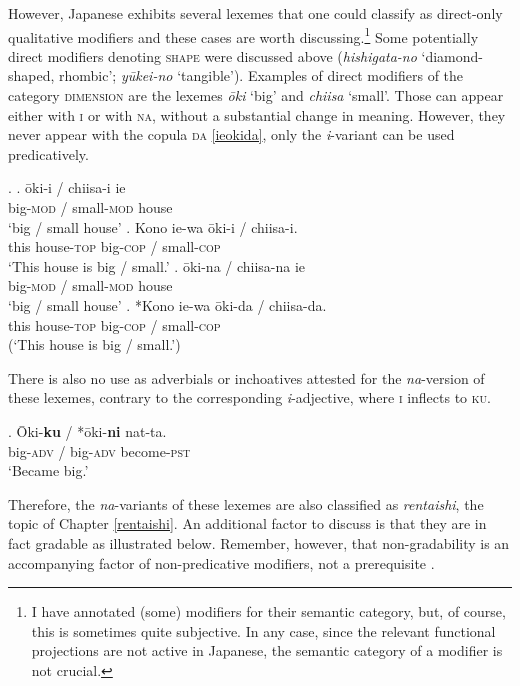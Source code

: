 \documentclass [output=book,colorlinks,citecolor=brown]{langscibook}
\begin{document}
However, Japanese exhibits several lexemes that one could classify as direct-only qualitative modifiers and these cases are worth discussing.\footnote{I have annotated (some) modifiers for their semantic category, but, of course, this is sometimes quite subjective. In any case, since the relevant functional projections are not active in Japanese, the semantic category of a modifier is not crucial.} Some potentially direct modifiers denoting \textsc{shape} were discussed above (\textit{hishigata-no} `diamond-shaped, rhombic’; \textit{yūkei-no} `tangible’). Examples of direct modifiers of the category \textsc{dimension} are the lexemes \textit{ōki} `big' and \textit{chiisa} `small’. Those can appear either with \textsc{i} or with \textsc{na}, without a substantial change in meaning. However, they never appear with the copula \textsc{da} \ref{ieokida}, only the \textit{i}-variant can be used predicatively. %

\newpage

\ex. \ag. ōki-i / chiisa-i ie\\
big-\textsc{mod} / small-\textsc{mod} house\\
`big / small house'
\bg. Kono ie-wa ōki-i / chiisa-i.\\
this house-\textsc{top} big-\textsc{cop} / small-\textsc{cop}\\
`This house is big / small.’
\cg. ōki-na / chiisa-na ie\\
big-\textsc{mod} / small-\textsc{mod} house\\
`big / small house'
\dg. *Kono ie-wa ōki-da / chiisa-da.\\
this house-\textsc{top} big-\textsc{cop} / small-\textsc{cop}\\
(`This house is big / small.’) \label{ieokida}

There is also no use as adverbials or inchoatives attested for the \textit{na}-version of these lexemes, contrary to the corresponding \textit{i}-adjective, where \textsc{i} inflects to \textsc{ku}. %

\exg. Ōki-\textbf{ku} / *ōki-\textbf{ni} nat-ta.\\
big-\textsc{adv} / big-\textsc{adv} become-\textsc{pst}\\
`Became big.’

Therefore, the \textit{na}-variants of these lexemes are also classified as \textit{rentaishi}, the topic of Chapter \ref{rentaishi}. An additional factor to discuss is that they are in fact gradable as illustrated below. Remember, however, that non-gradability is an accompanying factor of non-predicative modifiers, not a prerequisite \citep[47]{cinque:2010:adj}. %
\end{document}
